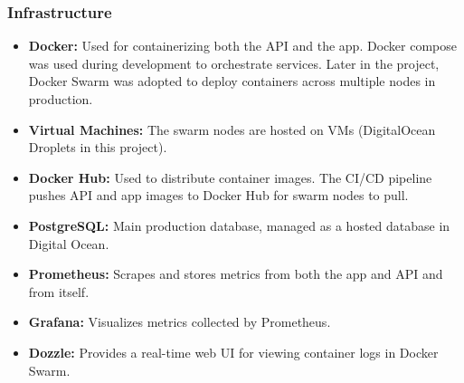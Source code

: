 \subsubsection{Infrastructure}
\begin{itemize}
    \item \textbf{Docker:} Used for containerizing both the API and the app. Docker compose was used during development to orchestrate services. Later in the project, Docker Swarm was adopted to deploy containers across multiple nodes in production.
    \item \textbf{Virtual Machines:} The swarm nodes are hosted on VMs (DigitalOcean Droplets in this project).
    \item \textbf{Docker Hub:} Used to distribute container images. The CI/CD pipeline pushes API and app images to Docker Hub for swarm nodes to pull.
    \item \textbf{PostgreSQL:} Main production database, managed as a hosted database in Digital Ocean.
    \item \textbf{Prometheus:} Scrapes and stores metrics from both the app and API and from itself.
    \item \textbf{Grafana:} Visualizes metrics collected by Prometheus.
    \item \textbf{Dozzle:} Provides a real-time web UI for viewing container logs in Docker Swarm.
\end{itemize}